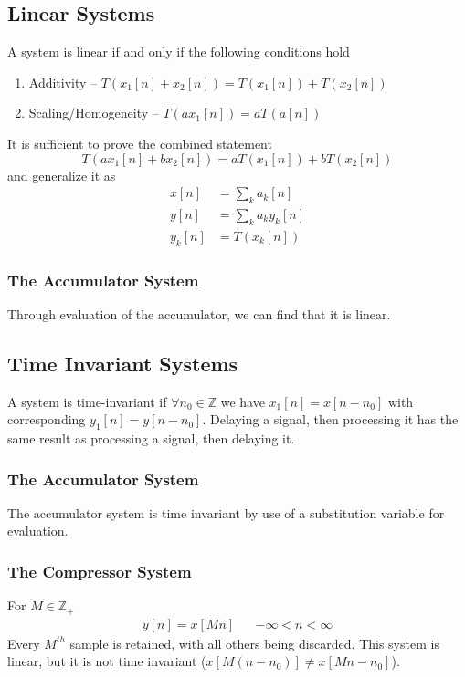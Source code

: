 \documentclass{article}
\begin{document}
\subsection{Linear Systems}
A system is linear if and only if the following conditions hold
\begin{enumerate}
    \item Additivity -- $\textit{T}(x_1[n] + x_2[n]) = \textit{T}(x_1[n])+\textit{T}(x_2[n])$
    \item Scaling/Homogeneity -- $T(ax_1[n]) = aT(a[n])$
\end{enumerate}
It is sufficient to prove the combined statement
\[
    T(ax_1[n]+bx_2[n])=aT(x_1[n])+bT(x_2[n])
\]
and generalize it as
\begin{align*}
    x[n] &= \sum_k a_k[n] \\
    y[n] &= \sum_k a_ky_k[n]\\
    y_k[n] &= T(x_k[n])
\end{align*}


\subsubsection{The Accumulator System}
Through evaluation of the accumulator, we can find that it is linear.

\subsection{Time Invariant Systems}
A system is time-invariant if $\forall n_0\in\mathbb{Z}$ we have $x_1[n]=x[n-n_0]$ with corresponding $y_1[n]=y[n-n_0]$. Delaying a signal, then processing it has the same result as processing a signal, then delaying it.

\subsubsection{The Accumulator System}
The accumulator system is time invariant by use of a substitution variable for evaluation.

\subsubsection{The Compressor System}
For $M\in\mathbb{Z}_+$
\begin{align}
    y[n]=x[Mn] &&-\infty<n<\infty
\end{align}
Every $M^{th}$ sample is retained, with all others being discarded.
This system is linear, but it is not time invariant ($x[M(n-n_0)]\ne x[Mn-n_0]$).
\end{document}
